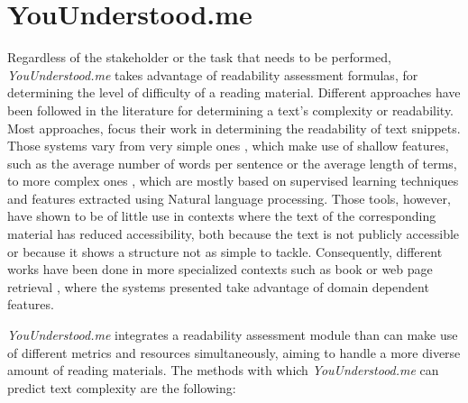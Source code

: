 \documentclass{sig-alternate-05-2015}
\begin{document}
 

 

\section{YouUnderstood.me}


\noindent
Regardless of the stakeholder or the task that needs to be performed, \textit{YouUnderstood.me}
takes advantage of readability assessment formulas, for determining the level of difficulty of a reading material. Different approaches have been followed in the literature for determining a text's complexity or readability. Most approaches, focus their work in determining the readability of text snippets. Those systems vary from very simple ones \cite{flesch1948new}, which make use of shallow features, such as the average number of words per sentence or the average length of terms, to more complex ones \cite{gonzalez2014simple,franccois2012ai,dell2011read} , which are mostly based on supervised learning techniques and features extracted using Natural language processing. Those tools, however,  have shown to be of little use in contexts where the text of the corresponding material has reduced accessibility, both because the text is not publicly accessible or because it shows a structure  not as simple to tackle. Consequently, different works have been done in more specialized contexts such as book \cite{denning2015readability,pera2014automating} or web page retrieval \cite{lau2006bilingual}, where the systems presented take advantage of domain dependent features.


\textit{YouUnderstood.me} integrates a readability assessment module than can make use of different metrics and resources simultaneously, aiming to handle a more diverse amount of reading materials. The methods with which  \textit{YouUnderstood.me} can predict text complexity are the following:
\end{document}
